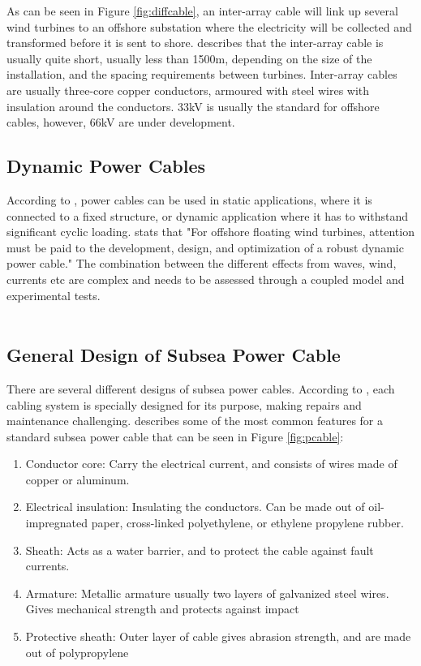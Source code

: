 \noindent As can be seen in Figure \ref{fig:diffcable}, an inter-array cable will link up several wind turbines to an offshore substation where the electricity will be collected and transformed before it is sent to shore. \cite{srinil2016} describes that the inter-array cable is usually quite short, usually less than 1500m, depending on the size of the installation, and the spacing requirements between turbines. Inter-array cables are usually three-core copper conductors, armoured with steel wires with insulation around the conductors. 33kV is usually the standard for offshore cables, however, 66kV are under development. \newline
\newline
  
  \subsection{Dynamic Power Cables}
According to \cite{Thies2012}, power cables can be used in static applications, where it is connected to a fixed structure, or dynamic application where it has to withstand significant cyclic loading. \cite{srinil2016} stats that "For offshore floating wind turbines, attention must be paid to the development, design, and optimization of a robust dynamic power cable." The combination between the different effects from waves, wind, currents etc are complex and needs to be assessed through a coupled model and experimental tests. \\\\
\subsection{General Design of Subsea Power Cable}
There are several different designs of subsea power cables. According to \cite{Beckman}, each cabling system is specially designed for its purpose, making repairs and maintenance challenging. \cite{Thies2012} describes some of the most common features for a standard subsea power cable that can be seen in Figure \ref{fig:pcable}: 

\begin{enumerate}[label=\Alph*]
\item Conductor core: Carry the electrical current, and consists of wires made of copper or aluminum. 
\item Electrical insulation: Insulating the conductors. Can be made out of oil-impregnated paper, cross-linked polyethylene, or ethylene propylene rubber.
\item Sheath: Acts as a water barrier, and to protect the cable against fault currents. 
\item Armature: Metallic armature usually two layers of galvanized steel wires. Gives mechanical strength and protects against impact
\item Protective sheath: Outer layer of cable gives abrasion strength, and are made out of polypropylene
\end{enumerate}


